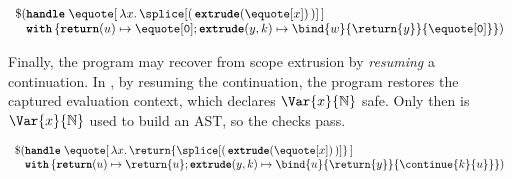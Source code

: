 \begin{code} 
 \begin{source}
  $\begin{array}{l}
      \$(\textbf{\texttt{handle}} \; \equote[\,{\lambda x. \,\splice[(\,{{\textbf{\texttt{extrude}}(\equote[x])}}\,)]}\,] \\
      \;\;\,\, \textbf{\texttt{with}} \, \{ \textbf{\texttt{return}}(u) \mapsto {\equote[\texttt{0}]}; \textbf{\texttt{extrude}}(y, k) \mapsto {\bind{w}{\return{y}}{\equote[\texttt{0}]}}\})
    \end{array}$
 \end{source}
 \label{listing:eager-scope-extrusion-unsafe-no-use}
\end{code}

Finally, the program may recover from scope extrusion by \textit{resuming} a continuation. In , by resuming the continuation, the program restores the captured evaluation context, which declares $\Var{x}{\mathbb{N}}$ safe. Only then is $\Var{x}{\mathbb{N}}$ used to build an AST, so the checks pass.

\begin{code} 
 \begin{source}
  $\begin{array}{l}
      \$ (\textbf{\texttt{handle}} \; \equote[\, {\lambda x. \,\return{\splice[( \, {{\textbf{\texttt{extrude}}(\equote[x])}} \,)]}} \,] \\
      \;\;\,\, \textbf{\texttt{with}} \, \{ \textbf{\texttt{return}}(u) \mapsto {\return{u}}; \textbf{\texttt{extrude}}(y, k) \mapsto {\bind{u}{\return{y}}{\continue{k}{u}}}\})
    \end{array}$
 \end{source}
 \label{listing:eager-scope-extrusion-unsafe-continue}
\end{code}


